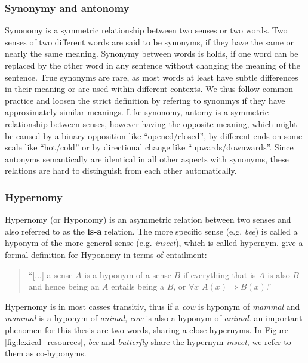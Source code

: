 \subsubsection{Synonymy and antonomy}
Synonomy is a symmetric relationship between two senses or two words. Two senses of two different words are said to be synonyms, if they have the same or nearly the same meaning. Synonymy between words is holds, if one word can be replaced by the other word in any sentence  without changing the meaning of the sentence. True synonyms are rare, as most words at least have subtle differences in their meaning or are used within different contexts. We thus follow common practice and loosen the strict definition by refering to synonmys if they have approximately similar meanings. Like synonomy, antomy is a symmetric relationship between senses, however having the opposite meaning, which might be caused by a binary opposition like ``opened/closed'', by different ends on some scale like ``hot/cold'' or by directional change like ``upwards/downwards''. Since antonyms semantically are identical in all other aspects with synonyms, these relations are hard to distinguish from each other automatically.

\subsubsection{Hypernomy}
Hypernomy (or Hyponomy) is an asymmetric relation between two senses and also referred to as the \textbf{is-a} relation. The more specific sense (e.g. \textit{bee}) is called a hyponym of the more general sense (e.g. \textit{insect}), which is called hypernym. \cite{Jurafsky2008May} give a formal definition for Hyponomy in terms of entailment: 
\begin{quotation}\noindent
``[...] a sense $A$ is a hyponym of a sense $B$ if everything that is $A$ is also $B$ and hence being an $A$ entails being a $B$, or $\forall x$ $A(x) \Rightarrow B(x)$.'' \citep{Jurafsky2008May}
\end{quotation}
Hypernomy is in most casses transitiv, thus if a \textit{cow} is hyponym of \textit{mammal} and \textit{mammal} is a hyponym of \textit{animal}, \textit{cow} is also a hyponym of \textit{animal}. an important phenomen for this thesis are two words, sharing a close hypernyms. In Figure \ref{fig:lexical_resources}, \textit{bee} and \textit{butterfly} share the hypernym \textit{insect}, we refer to them as co-hyponyms.

